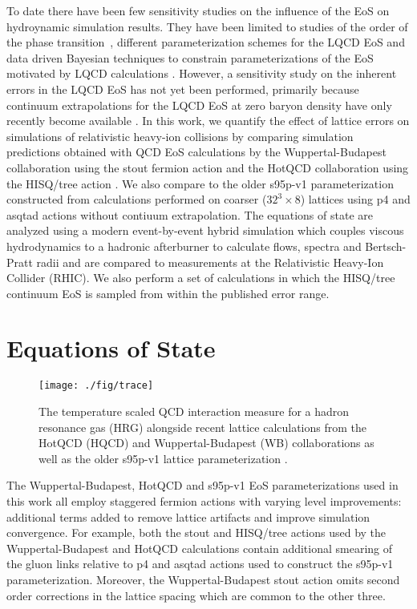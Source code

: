 \documentclass[aps,prc,reprint,amsmath,nofootinbib,superscriptaddress]{revtex4-1}
\begin{document}
To date there have been few sensitivity studies on the influence of the EoS on hydroynamic simulation results. 
They have been limited to studies of the order of the phase transition~\cite{Huovinen:2005gy}, different parameterization schemes for the LQCD EoS \cite{Huovinen:2009yb} and data driven Bayesian techniques to constrain parameterizations of the EoS motivated by LQCD calculations \cite{Pratt:2015zsa,Sangaline:2015isa}.
However, a sensitivity study on the inherent errors in the LQCD EoS has not yet been performed, primarily because continuum extrapolations for the LQCD EoS at zero baryon density have only recently become available \cite{Borsanyi:2013bia,Bazavov:2014pvz}. 
In this work, we quantify the effect of lattice errors on simulations of relativistic heavy-ion collisions by comparing simulation predictions obtained with QCD EoS calculations by the Wuppertal-Budapest collaboration using the stout fermion action \cite{Borsanyi:2013bia} and the HotQCD collaboration using the HISQ/tree action \cite{Bazavov:2014pvz}.  
We also compare to the older s95p-v1 parameterization \cite{Huovinen:2009yb} constructed from calculations performed on coarser ($32^3 \times 8$) lattices using p4 and asqtad actions without contiuum extrapolation.  
The equations of state are analyzed using a modern event-by-event hybrid simulation which couples viscous hydrodynamics to a hadronic afterburner to calculate flows, spectra and Bertsch-Pratt radii and are compared to measurements at the Relativistic Heavy-Ion Collider (RHIC).
We also perform a set of calculations in which the HISQ/tree continuum EoS is sampled from within the published error range.


\section{Equations of State}
\label{eos}

\begin{figure}[t]
  \texttt{[image: ./fig/trace]}
  \caption{\label{fig:trace} The temperature scaled QCD interaction measure for a hadron resonance gas (HRG) alongside recent lattice calculations from the HotQCD (HQCD) and Wuppertal-Budapest (WB) collaborations as well as the older s95p-v1 lattice parameterization \cite{Bazavov:2014pvz, Borsanyi:2013bia, Huovinen:2009yb}.}
\end{figure}

The Wuppertal-Budapest, HotQCD and s95p-v1 EoS parameterizations used in this work all employ staggered fermion actions with varying level improvements: additional terms added to remove lattice artifacts and improve simulation convergence. 
For example, both the stout and HISQ/tree actions used by the Wuppertal-Budapest and HotQCD calculations contain additional smearing of the gluon links relative to p4 and asqtad actions used to construct the s95p-v1 parameterization.
Moreover, the Wuppertal-Budapest stout action omits second order corrections in the lattice spacing which are common to the other three. 
\end{document}
